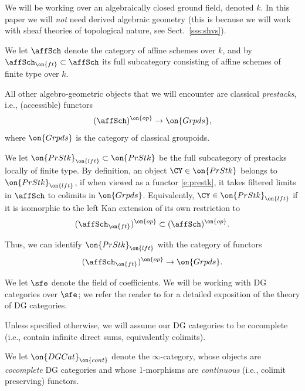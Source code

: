 \documentclass[9pt]{amsart}
\theoremstyle{definition}
\theoremstyle{remark}
\newcommand{\secref}[1]{Sect.~\ref{#1}}
\numberwithin{equation}{section}
\begin{document}
We will be working over an algebraically closed ground field, denoted $k$.   In this paper we will \emph{not} need
derived algebraic geometry (this is because we will work with sheaf theories of topological nature, see \secref{sss:shvs}). 

\medskip

We let $\affSch$ denote the category of affine schemes over $k$, and by
$\affSch_{\on{ft}}\subset \affSch$ 
its full subcategory consisting of affine schemes of finite type over $k$.

\medskip

All other algebro-geometric objects that we will encounter are classical \emph{prestacks}, i.e., (accessible) functors
\begin{equation} \label{e:prestk}
(\affSch)^{\on{op}}\to \on{Grpds},
\end{equation}
where $\on{Grpds}$ is the category of classical groupoids. 

\medskip

We let $\on{PrStk}_{\on{lft}}\subset \on{PrStk}$ be the full subcategory of prestacks locally of finite type. 
By definition, an object $\CY\in \on{PrStk}$ belongs to $\on{PrStk}_{\on{lft}}$, if when viewed as a functor
\eqref{e:prestk}, it takes filtered limits in $\affSch$ to colimits in $\on{Grpds}$. Equivalently, $\CY\in \on{PrStk}_{\on{lft}}$
if it is isomorphic to the left Kan extension of its own restriction to 
$$(\affSch_{\on{ft}})^{\on{op}}\subset (\affSch)^{\on{op}}.$$

Thus, we can identify $\on{PrStk}_{\on{lft}}$ with the category of functors
$$(\affSch_{\on{ft}})^{\on{op}}\to \on{Grpds}.$$

\sssec{}  \label{sss:DG categories}

We let $\sfe$ denote the field of coefficients. We will be working with DG categories over $\sfe$; we refer the 
reader to \cite[Chapter 1, Sect. 10]{GR1} for a detailed exposition of the theory of DG categories. 

\medskip

Unless specified otherwise, we will assume our DG categories to be cocomplete (i.e., contain infinite direct sums,
equivalently colimits). 

\medskip

We let $\on{DGCat}_{\on{cont}}$ denote the $\infty$-category, whose objects are \emph{cocomplete} DG
categories and whose 1-morphisms are \emph{continuous} (i.e., colimit preserving) functors. 

\medskip
\end{document}
